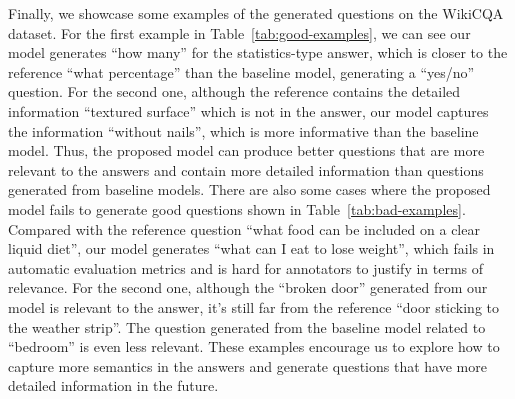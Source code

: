 \documentclass[11pt]{article}
\begin{document}
Finally, we showcase some examples of the generated questions on the WikiCQA dataset. 
For the first example in Table~\ref{tab:good-examples}, we can see our model generates ``how many'' for the statistics-type answer, which is closer to the reference ``what percentage'' than the baseline model, generating a ``yes/no'' question. For the second one, although the reference contains the detailed information ``textured surface'' which is not in the answer, our model captures the information ``without nails'', which is more informative than the baseline model. Thus, the proposed model can produce better questions that are more relevant to the answers and contain more detailed information than questions generated from baseline models.
There are also some cases where the proposed model fails to generate good questions shown in Table~\ref{tab:bad-examples}. 
Compared with the reference question ``what food can be included on a clear liquid diet'', our model generates ``what can I eat to lose weight'', which fails in automatic evaluation metrics and is hard for annotators to justify in terms of relevance. 
For the second one, although the ``broken door'' generated from our model is relevant to the answer, it's still far from the reference ``door sticking to the weather strip''. The question generated from the baseline model related to ``bedroom'' is even less relevant. These examples encourage us to explore how to capture more semantics in the answers and generate questions that have more detailed information in the future.
\end{document}
